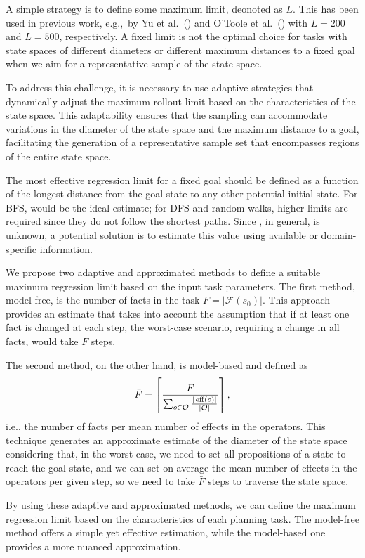 A simple strategy is to define some maximum limit, deonoted as $L$. This has been used in previous work, e.g.,~by Yu et al.~(\citeyear{Yu.etal/2020}) and O'Toole et al.~(\citeyear{OToole/2022}) with $L=200$ and $L=500$, respectively. A fixed limit is not the optimal choice for tasks with state spaces of different diameters or different maximum distances to a fixed goal when we aim for a representative sample of the state space.

To address this challenge, it is necessary to use adaptive strategies that dynamically adjust the maximum rollout limit based on the characteristics of the state space. This adaptability ensures that the sampling can accommodate variations in the diameter of the state space and the maximum distance to a goal, facilitating the generation of a representative sample set that encompasses regions of the entire state space.

The most effective regression limit for a fixed goal should be defined as a function of the longest distance \distfarthest from the goal state to any other potential initial state. For BFS, \distfarthest would be the ideal estimate; for DFS and random walks, higher limits are required since they do not follow the shortest paths.
Since \distfarthest, in general, is unknown, a potential solution is to estimate this value using available or domain-specific information.

We propose two adaptive and approximated methods to define a suitable maximum regression limit based on the input task parameters. The first method, model-free, is the number of facts in the task $F=|\mathcal{F}(s_0)|$. This approach provides an estimate that takes into account the assumption that if at least one fact is changed at each step, the worst-case scenario, requiring a change in all facts, would take $F$ steps.

The second method, on the other hand, is model-based and defined as $$\bar F=\left\lceil \frac{F}{\sum_{o\in \mathcal{O}} \frac{|\operatorname{eff}(o)|}{|\mathcal{O}|}}\right\rceil,$$ i.e., the number of facts per mean number of effects in the operators. This technique generates an approximate estimate of the diameter of the state space considering that, in the worst case, we need to set all propositions of a state to reach the goal state, and we can set on average the mean number of effects in the operators per given step, so we need to take $\bar F$ steps to traverse the state space.

By using these adaptive and approximated methods, we can define the maximum regression limit based on the characteristics of each planning task. The model-free method offers a simple yet effective estimation, while the model-based one provides a more nuanced approximation.

